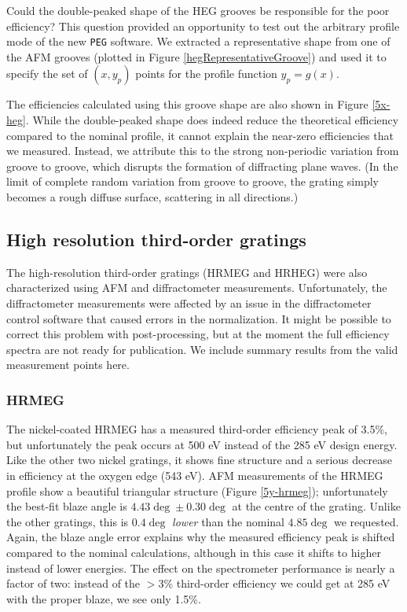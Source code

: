 Could the double-peaked shape of the HEG grooves be responsible for the poor efficiency?  This question provided an opportunity to test out the arbitrary profile mode of the new \texttt{PEG} software.  We extracted a representative shape from one of the AFM grooves (plotted in Figure \ref{hegRepresentativeGroove}) and used it to specify the set of $(x,y_p)$ points for the profile function $y_p = g(x)$.

The efficiencies calculated using this groove shape are also shown in Figure \ref{5x-heg}.  While the double-peaked shape does indeed reduce the theoretical efficiency compared to the nominal profile, it cannot explain the near-zero efficiencies that we measured.  Instead, we attribute this to the strong non-periodic variation from groove to groove, which disrupts the formation of diffracting plane waves.  (In the limit of complete random variation from groove to groove, the grating simply becomes a rough diffuse surface, scattering in all directions.)

\subsection{High resolution third-order gratings}
The high-resolution third-order gratings (HRMEG and HRHEG) were also characterized using AFM and diffractometer measurements.  Unfortunately, the diffractometer measurements were affected by an issue in the diffractometer control software that caused errors in the normalization.  It might be possible to correct this problem with post-processing, but at the moment the full efficiency spectra are not ready for publication.  We include summary results from the valid measurement points here.

\subsubsection{HRMEG}
The nickel-coated HRMEG has a measured third-order efficiency peak of 3.5\%, but unfortunately the peak occurs at 500 eV instead of the 285 eV design energy.  Like the other two nickel gratings, it shows fine structure and a serious decrease in efficiency at the oxygen edge (543 eV).  AFM measurements of the HRMEG profile show a beautiful triangular structure (Figure \ref{5y-hrmeg}); unfortunately the best-fit blaze angle is $4.43\deg \pm 0.30\deg$ at the centre of the grating.  Unlike the other gratings, this is $0.4\deg$ \emph{lower} than the nominal $4.85\deg$ we requested.  Again, the blaze angle error explains why the measured efficiency peak is shifted compared to the nominal calculations, although in this case it shifts to higher instead of lower energies.  The effect on the spectrometer performance is nearly a factor of two: instead of the $>3\%$ third-order efficiency we could get at 285 eV with the proper blaze, we see only 1.5\%.

